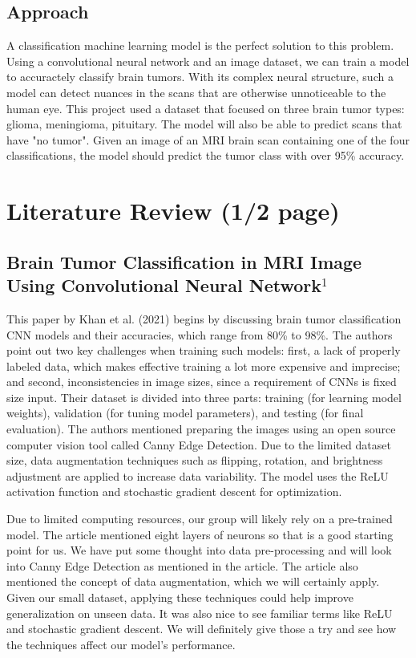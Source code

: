 \documentclass[conference]{IEEEtran}
\begin{document}
\subsection{\large Approach}
A classification machine learning model is the perfect solution to this problem. Using a convolutional neural network and an image dataset, we can train a model to accuractely classify brain tumors. With its complex neural structure, such a model can detect nuances in the scans that are otherwise unnoticeable to the human eye. This project used a dataset that focused on three brain tumor types: glioma, meningioma, pituitary. The model will also be able to predict scans that have "no tumor". Given an image of an MRI brain scan containing one of the four classifications, the model should predict the tumor class with over 95\% accuracy.

\section{\large Literature Review (1/2 page)}

\subsection{\large Brain Tumor Classification in MRI Image Using Convolutional Neural Network$^{1}$}

This paper by Khan et al. (2021) begins by discussing brain tumor classification CNN models and their accuracies, which range from 80\% to 98\%. The authors point out two key challenges when training such models: first, a lack of properly labeled data, which makes effective training a lot more expensive and imprecise; and second, inconsistencies in image sizes, since a requirement of CNNs is fixed size input. Their dataset is divided into three parts: training (for learning model weights), validation (for tuning model parameters), and testing (for final evaluation). The authors mentioned preparing the images using an open source computer vision tool called Canny Edge Detection. Due to the limited dataset size, data augmentation techniques such as flipping, rotation, and brightness adjustment are applied to increase data variability. The model uses the ReLU activation function and stochastic gradient descent for optimization.

Due to limited computing resources, our group will likely rely on a pre-trained model. The article mentioned eight layers of neurons so that is a good starting point for us. We have put some thought into data pre-processing and will look into Canny Edge Detection as mentioned in the article. The article also mentioned the concept of data augmentation, which we will certainly apply. Given our small dataset, applying these techniques could help improve generalization on unseen data. It was also nice to see familiar terms like ReLU and stochastic gradient descent. We will definitely give those a try and see how the techniques affect our model's performance.
\end{document}
